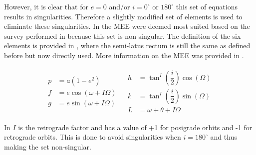 However, it is clear that for $e=0$ and/or $i=0^{\circ}$ or $180^{\circ}$ this set of equations results in singularities. Therefore a slightly modified set of elements is used to eliminate these singularities. In \cite{gebbett2014multi} the \ac{MEE} were deemed most suited based on the survey performed in \citep{hintz2008survey} because this set is non-singular. The definition of the six elements is provided in , where the semi-latus rectum is still the same as defined before but now directly used. More information on the \ac{MEE} was provided in . 



\begin{align} \label{eq:MEE}
\begin{split} 
p&=a\left(1-e^{2}\right)\\
f&=e\cos\left(\omega+I\Omega\right)\\
g&=e\sin\left(\omega+I\Omega\right)
\end{split} 
&
\begin{split}
h&=\tan^{I}\left(\dfrac{i}{2}\right)\cos\left(\Omega\right)\\
k&=\tan^{I}\left(\dfrac{i}{2}\right)\sin\left(\Omega\right)\\
L&=\omega+\theta+I\Omega
\end{split}
\end{align}



In  $I$ is the retrograde factor and has a value of +1 for posigrade orbits and -1 for retrograde orbits. This is done to avoid singularities when $i=180^{\circ}$ and thus making the set non-singular.


